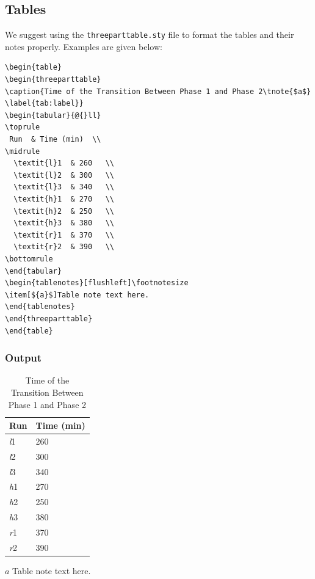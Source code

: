 \documentclass[]{imag-ms-template}
\begin{document}
\subsection{Tables}  

We suggest using the \verb!threeparttable.sty! file to format the tables
and their notes properly. Examples are given below:

\begin{verbatim}
\begin{table}
\begin{threeparttable}
\caption{Time of the Transition Between Phase 1 and Phase 2\tnote{$a$}
\label{tab:label}}
\begin{tabular}{@{}ll}
\toprule
 Run  & Time (min)  \\
\midrule
  \textit{l}1  & 260   \\
  \textit{l}2  & 300   \\
  \textit{l}3  & 340   \\
  \textit{h}1  & 270   \\
  \textit{h}2  & 250   \\
  \textit{h}3  & 380   \\
  \textit{r}1  & 370   \\
  \textit{r}2  & 390   \\
\bottomrule
\end{tabular}
\begin{tablenotes}[flushleft]\footnotesize
\item[${a}$]Table note text here.
\end{tablenotes}
\end{threeparttable}
\end{table}
\end{verbatim}

\subsubsection*{Output}

\begin{table}[h!]
\begin{threeparttable}
\caption{Time of the Transition Between Phase 1 and Phase 2
\label{tab:label}}
\setlength{\tabcolsep}{45pt}%
\begin{tabular}{@{}ll}
\toprule
 Run  & Time (min)  \\
\midrule
  \textit{l}1  & 260   \\
  \textit{l}2  & 300   \\
  \textit{l}3  & 340   \\
  \textit{h}1  & 270   \\
  \textit{h}2  & 250   \\
  \textit{h}3  & 380   \\
  \textit{r}1  & 370   \\
  \textit{r}2  & 390   \\
\bottomrule
\end{tabular}
\begin{tablenotes}[flushleft]\footnotesize
\item[${a}$]Table note text here.
\end{tablenotes}
\end{threeparttable}
\end{table}
\end{document}
